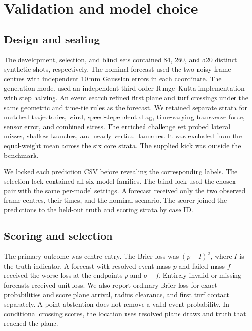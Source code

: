 
\section{Validation and model choice}\label{sec:validation}

\subsection{Design and sealing}

The development, selection, and blind sets contained 84, 260, and 520 distinct synthetic shots, respectively. The nominal forecast used the two noisy frame centres with independent 10\,mm Gaussian errors in each coordinate. The generation model used an independent third-order Runge--Kutta implementation with step halving. An event search refined first plane and turf crossings under the same geometric and time-tie rules as the forecast. We retained separate strata for matched trajectories, wind, speed-dependent drag, time-varying transverse force, sensor error, and combined stress. The enriched challenge set probed lateral misses, shallow launches, and nearly vertical launches. It was excluded from the equal-weight mean across the six core strata. The supplied kick was outside the benchmark.

We locked each prediction CSV before revealing the corresponding labels. The selection lock contained all six model families. The blind lock used the chosen pair with the same per-model settings. A forecast received only the two observed frame centres, their times, and the nominal scenario. The scorer joined the predictions to the held-out truth and scoring strata by case ID.

\subsection{Scoring and selection}

The primary outcome was centre entry. The Brier loss was $(p-I)^2$, where $I$ is the truth indicator. A forecast with resolved event mass $p$ and failed mass $f$ received the worse loss at the endpoints $p$ and $p+f$. Entirely invalid or missing forecasts received unit loss. We also report ordinary Brier loss for exact probabilities and score plane arrival, radius clearance, and first turf contact separately. A point abstention does not remove a valid event probability. In conditional crossing scores, the location uses resolved plane draws and truth that reached the plane.

